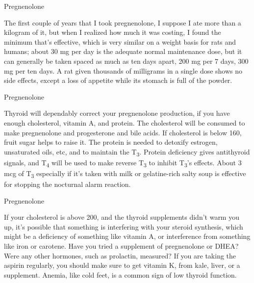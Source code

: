 \documentclass[11pt,oneside,openany,extrafontsizes]{memoir}
\begin{document}
\begin{standalonequote}{Pregnenolone}

    \begin{answer}
      The first couple of years that I took pregnenolone, I suppose I ate more than a kilogram of it, but when I realized how much it was costing, I found the minimum that's effective, which is very similar on a weight basis for rats and humans; about 30 mg per day is the adequate normal maintenance dose, but it can generally be taken spaced as much as ten days apart, 200 mg per 7 days, 300 mg per ten days. A rat given thousands of milligrams in a single dose shows no side effects, except a loss of appetite while its stomach is full of the powder.
    \end{answer}
\end{standalonequote}

\begin{standalonequote}{Pregnenolone}

    \begin{answer}
      Thyroid will dependably correct your pregnenolone production, if you have enough cholesterol, vitamin A, and protein. The cholesterol will be consumed to make pregnenolone and progesterone and bile acids. If cholesterol is below 160, fruit sugar helps to raise it. The protein is needed to detoxify estrogen, unsaturated oils, etc, and to maintain the T\textsubscript{3}. Protein deficiency gives antithyroid signals, and T\textsubscript{4} will be used to make reverse T\textsubscript{3} to inhibit T\textsubscript{3}'s effects. About 3 mcg of T\textsubscript{3} especially if it's taken with milk or gelatine-rich salty soup is effective for stopping the nocturnal alarm reaction.
    \end{answer}
\end{standalonequote}

\begin{standalonequote}{Pregnenolone}

    \begin{answer}
      If your cholesterol is above 200, and the thyroid supplements didn't warm you up, it's possible that something is interfering with your steroid synthesis, which might be a deficiency of something like vitamin A, or interference from something like iron or carotene. Have you tried a supplement of pregnenolone or DHEA? Were any other hormones, such as prolactin, measured? If you are taking the aspirin regularly, you should make sure to get vitamin K, from kale, liver, or a supplement. Anemia, like cold feet, is a common sign of low thyroid function.
    \end{answer}
\end{standalonequote}
\end{document}
